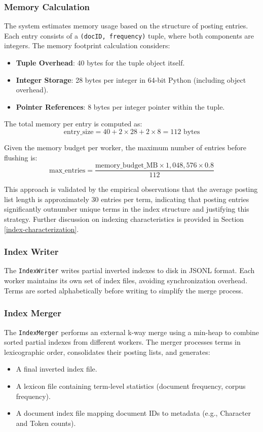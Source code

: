 \documentclass[sigconf]{acmart}
\begin{document}
\subsubsection{Memory Calculation}
The system estimates memory usage based on the structure of posting entries. Each entry consists of a \texttt{(docID, frequency)} tuple, where both components are integers. The memory footprint calculation considers:
\begin{itemize}
  \item \textbf{Tuple Overhead}: 40 bytes for the tuple object itself.
  \item \textbf{Integer Storage}: 28 bytes per integer in 64-bit Python (including object overhead).
  \item \textbf{Pointer References}: 8 bytes per integer pointer within the tuple.
\end{itemize}

The total memory per entry is computed as:
\[
\text{entry\_size} = 40 + 2 \times 28 + 2 \times 8 = 112 \text{ bytes}
\]

Given the memory budget per worker, the maximum number of entries before flushing is:
\[
\text{max\_entries} = \frac{\text{memory\_budget\_MB} \times 1,048,576 \times 0.8}{112}
\]

This approach is validated by the empirical observations that the average posting list length is approximately 30 entries per term, indicating that posting entries significantly outnumber unique terms in the index structure and justifying this strategy. Further discussion on indexing characteristics is provided in Section \ref{index-characterization}.

\subsubsection{Index Writer}
The \texttt{IndexWriter} writes partial inverted indexes to disk in JSONL format. Each worker maintains its own set of index files, avoiding synchronization overhead. Terms are sorted alphabetically before writing to simplify the merge process.

\subsubsection{Index Merger}
The \texttt{IndexMerger} performs an external k-way merge using a min-heap to combine sorted partial indexes from different workers. The merger processes terms in lexicographic order, consolidates their posting lists, and generates:
\begin{itemize}
    \item A final inverted index file.
    \item A lexicon file containing term-level statistics (document frequency, corpus frequency).
    \item A document index file mapping document IDs to metadata (e.g., Character and Token counts).
\end{itemize}
\end{document}
